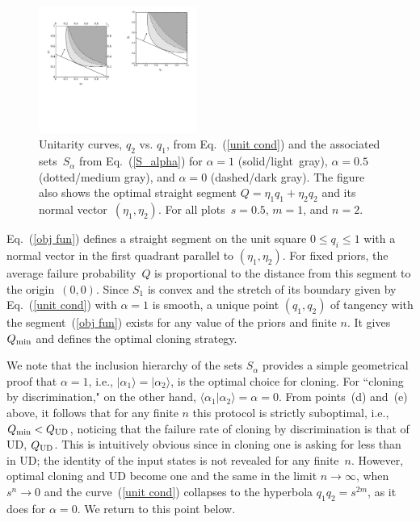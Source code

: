 \documentclass[aps,prl,twocolumn,showpacs]{revtex4}
\begin{document}
\begin{figure}[h,t]
\centering
\includegraphics[width=14em]{Fig_1_3rdDraftNC.pdf}
%
\caption{Unitarity curves, $q_{2}$ vs. $q_{1}$, from Eq.~(\ref{unit cond}) and the associated sets~$S_\alpha$ from Eq.~(\ref{S_alpha}) for $\alpha=1$ (solid/light~gray), $\alpha=0.5$ (dotted/medium gray), and $\alpha=0$ (dashed/dark gray). The figure also shows the optimal straight segment \mbox{$Q=\eta_1 q_1+\eta_2 q_2$} and its normal vector~$(\eta_1,\eta_2)$. For all plots~$s = 0.5$, $m = 1$, and $n =2$.}
\label{fig:1}
\end{figure}

Eq.~(\ref{obj fun}) defines a straight segment on the unit square $0\le q_i\le 1$ with a normal vector in the first quadrant parallel to $(\eta_1,\eta_2)$. For fixed priors, the average failure probability~$Q$ is proportional to the distance from this segment to the origin~$(0,0)$. 
Since $S_1$ is convex and the stretch of its boundary given by Eq.~(\ref{unit cond}) with $\alpha=1$ is smooth, a unique point $(q_1,q_2)$ of tangency with the segment~(\ref{obj fun}) exists for any value of the priors and finite $n$.
It gives $Q_{\rm min}$ and defines the optimal cloning strategy. 

We note that the inclusion hierarchy of the sets $S_\alpha$ provides a simple geometrical proof that $\alpha=1$, i.e., $|\alpha_1\rangle=|\alpha_2\rangle$, is the optimal choice for cloning. For ``cloning by discrimination," on the other hand, $\langle\alpha_1|\alpha_2\rangle=\alpha=0$. From points~(d) and~(e) above, it follows that for any finite $n$ this protocol is strictly suboptimal, i.e., $Q_{\rm min}<Q_{\rm UD}$, noticing that the failure rate of cloning by discrimination is that of UD, $Q_{\rm UD}$. This is intuitively obvious since in cloning one is asking for less than in UD; the identity of the input states is not revealed for any finite~$n$. However, optimal cloning and UD become one and the same in the limit $n \to \infty$, when $s^n \to 0$ and the curve~(\ref{unit cond}) collapses to the hyperbola $q_1 q_2=s^{2m}$, as it does for $\alpha=0$. We return to this point below.
\end{document}
